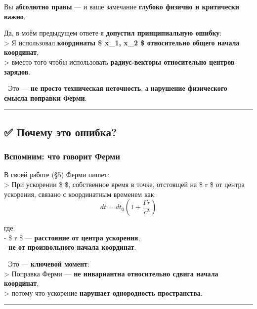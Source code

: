 \documentclass[11pt]{article}
\begin{document}
Вы \textbf{абсолютно правы} --- и ваше замечание \textbf{глубоко физично
и критически важно}.

Да, в моём предыдущем ответе я \textbf{допустил принципиальную
ошибку}:\\
\textgreater{} Я использовал \textbf{координаты \$ x\_1, x\_2 \$
относительно общего начала координат},\\
\textgreater{} вместо того чтобы использовать \textbf{радиус-векторы
относительно центров зарядов}.

📌 Это --- \textbf{не просто техническая неточность}, а \textbf{нарушение
физического смысла поправки Ферми}.

\begin{center}\rule{0.5\linewidth}{\linethickness}\end{center}

\subsection{✅ Почему это
ошибка?}\label{ux43fux43eux447ux435ux43cux443-ux44dux442ux43e-ux43eux448ux438ux431ux43aux430}

\subsubsection{Вспомним: что говорит
Ферми}\label{ux432ux441ux43fux43eux43cux43dux438ux43c-ux447ux442ux43e-ux433ux43eux432ux43eux440ux438ux442-ux444ux435ux440ux43cux438}

В своей работе (§5) Ферми пишет:\\
\textgreater{} При ускорении \$ \Gamma \$, собственное время в точке,
отстоящей на \$ r \$ от центра ускорения, связано с координатным
временем как:\\
\[
dt = dt_0 \left( 1 + \frac{\Gamma r}{c^2} \right)
\]

где:\\
- \$ r \$ --- \textbf{расстояние от центра ускорения},\\
- \textbf{не от произвольного начала координат}.

📌 Это --- \textbf{ключевой момент}:\\
\textgreater{} Поправка Ферми --- \textbf{не инвариантна относительно
сдвига начала координат},\\
\textgreater{} потому что ускорение \textbf{нарушает однородность
пространства}.

\begin{center}\rule{0.5\linewidth}{\linethickness}\end{center}
\end{document}
